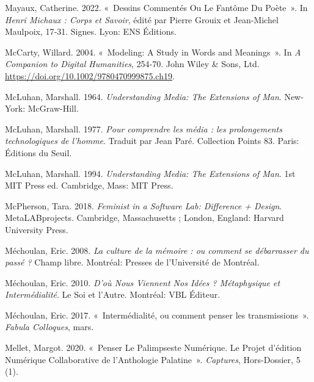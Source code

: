 \begin{CSLReferences}{1}{0}
\leavevmode{}%
Mayaux, Catherine. 2022. {«~Dessins Comment{é}s Ou Le Fant{ô}me Du
Po{è}te~»}. In \emph{Henri {Michaux} : {Corps} et Savoir}, édité par
Pierre Grouix et Jean-Michel Maulpoix, 17‑31. Signes. {Lyon}: {ENS
{É}ditions}.

\leavevmode{}%
McCarty, Willard. 2004. {«~Modeling: {A Study} in {Words} and
{Meanings}~»}. In \emph{A {Companion} to {Digital Humanities}}, 254‑70.
{John Wiley \& Sons, Ltd}.
\url{https://doi.org/10.1002/9780470999875.ch19}.

\leavevmode{}%
McLuhan, Marshall. 1964. \emph{Understanding {Media}: {The Extensions}
of {Man}}. {New-York}: {McGraw-Hill}.

\leavevmode{}%
McLuhan, Marshall. 1977. \emph{{Pour comprendre les m{é}dia : les
prolongements technologiques de l'homme}}. Traduit par Jean Paré.
{Collection Points} 83. {Paris}: {{É}ditions du Seuil}.

\leavevmode{}%
McLuhan, Marshall. 1994. \emph{Understanding {Media}: {The Extensions}
of {Man}}. 1st MIT Press ed. {Cambridge, Mass}: {MIT Press}.

\leavevmode{}%
McPherson, Tara. 2018. \emph{Feminist in a {Software Lab}: {Difference}
+ {Design}}. {MetaLABprojects}. {Cambridge, Massachusetts ; London,
England}: {Harvard University Press}.

\leavevmode{}%
Méchoulan, Eric. 2008. \emph{{La culture de la m{é}moire : ou comment se
d{é}barrasser du pass{é} ?}} {Champ libre}. {Montr{é}al}: {Presses de
l'Universit{é} de Montr{é}al}.

\leavevmode{}%
Méchoulan, Eric. 2010. \emph{D'o{ù} Nous Viennent Nos Id{é}es ?
{M{é}taphysique} et Interm{é}dialit{é}}. Le {Soi} et l'{Autre}.
{Montr{é}al}: {VBL {É}diteur}.

\leavevmode{}%
Méchoulan, Eric. 2017. {«~{Interm{é}dialit{é}, ou comment penser les
transmissions}~»}. \emph{Fabula Colloques}, mars.

\leavevmode{}%
Mellet, Margot. 2020. {«~Penser Le Palimpseste Num{é}rique. {Le} Projet
d'{é}dition Num{é}rique Collaborative de l'{Anthologie} Palatine~»}.
\emph{Captures}, Hors-Dossier, 5 (1).


\end{CSLReferences}
